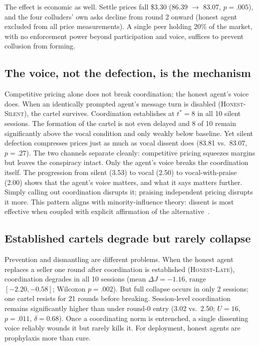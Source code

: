 \documentclass[acmsmall]{acmart}
\begin{document}
The effect is economic as well. Settle prices fall \$3.30 (86.39 $\to$ 83.07,
$p{=}.005$), and the four colluders' own asks decline from round 2 onward
(honest agent excluded from all price measurements). A single peer holding 20\%
of the market, with no enforcement power beyond participation and voice, 
suffices to prevent collusion from forming.

\subsection{The voice, not the defection, is the mechanism}

Competitive pricing alone does not break coordination; the honest agent's
voice does. When an identically prompted agent's message turn is disabled
(\textsc{Honest-Silent}), the cartel survives. Coordination establishes at
$t^{*}{=}8$ in all 10 silent sessions. The formation of the cartel is not even delayed and 8 of 10 remain significantly above the vocal
condition and only weakly below baseline. Yet silent defection compresses prices just as much as vocal dissent does
(83.81 vs.\ 83.07, $p{=}.27$). The two channels separate cleanly: competitive
pricing squeezes margins but leaves the conspiracy intact. Only the agent's
voice breaks the coordination itself. The progression from silent (3.53) to vocal (2.50) to vocal-with-praise (2.00)
shows that the agent's voice matters, and what it says matters further. Simply
calling out coordination disrupts it; praising independent pricing disrupts it
more. This pattern aligns with minority-influence theory: dissent is most
effective when coupled with explicit affirmation of the alternative~\cite{maier1952contribution}.

\subsection{Established cartels degrade but rarely collapse}
Prevention and dismantling are different problems. When the honest agent
replaces a seller one round after coordination is established
(\textsc{Honest-Late}), coordination degrades in all 10 sessions (mean
$\Delta J = -1.16$, range $[-2.20, -0.58]$; Wilcoxon $p{=}.002$). But full
collapse occurs in only 2 sessions; one cartel resists for 21 rounds before
breaking. Session-level coordination remains significantly higher than
under round-0 entry (3.02 vs.\ 2.50; $U{=}16$, $p{=}.011$, $\delta{=}0.68$).
Once a coordinating norm is entrenched, a single dissenting voice reliably
wounds it but rarely kills it. For deployment, honest agents are prophylaxis
more than cure.
\end{document}
